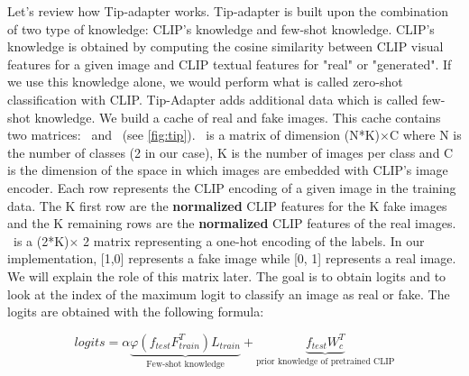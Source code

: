 \documentclass[12pt,a4paper]{article}
\begin{document}
Let's review how Tip-adapter works. Tip-adapter is built upon the combination of two type of knowledge: CLIP's knowledge and few-shot knowledge. CLIP's knowledge is obtained by computing the cosine similarity between CLIP visual features for a given image and CLIP textual features for "real" or "generated". If we use this knowledge alone, we would perform what is called zero-shot classification with CLIP. Tip-Adapter adds additional data which is called few-shot knowledge. We build a cache of real and fake images. This cache contains two matrices: \ft\ and \lt\ (see \autoref*{fig:tip}). \ft\ is a matrix of dimension (N*K)$\times$C where N is the number of classes (2 in our case), K is the number of images per class and C is the dimension of the space in which images are embedded with CLIP's image encoder. Each row represents the CLIP encoding of a given image in the training data. The K first row are the \textbf{normalized} CLIP features for the K fake images and the K remaining rows are the \textbf{normalized} CLIP features of the real images. \lt\ is a (2*K)$\times$ 2 matrix representing a one-hot encoding of the labels. In our implementation, [1,0] represents a fake image while [0, 1] represents a real image. We will explain the role of this matrix later. The goal is to obtain logits and to look at the index of the maximum logit to classify an image as real or fake. The logits are obtained with the following formula:

\begin{equation}
    logits = \alpha\underbrace{\varphi(f_{test}F_{train}^T)L_{train}}_{\text{Few-shot knowledge}} + \underbrace{f_{test}W_c^T}_{\text{prior knowledge of pretrained CLIP}} \nonumber
\end{equation}
\end{document}
